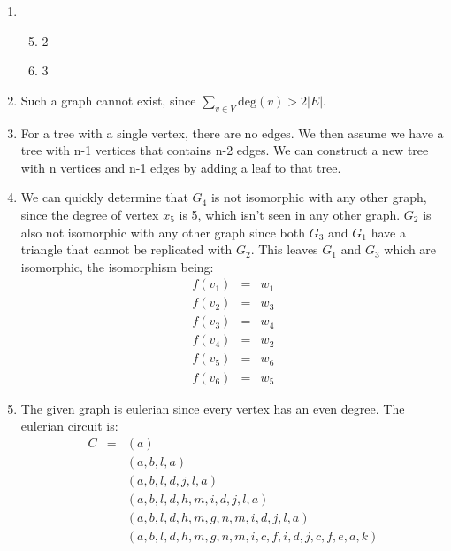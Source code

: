 \documentclass[12pt]{article}
\newcommand{\s}[1]{\setcounter{enumi}{#1}}
\begin{document}
\begin{enumerate}

  \item
    \begin{enumerate}
      \setcounter{enumii}{4}

       \item 2

       \item 3

    \end{enumerate}

  \s{2}

  \item Such a graph cannot exist, since $\sum_{v \in V} \mathrm{deg}(v) > 2 |E|$.

  \s{5}

  \item For a tree with a single vertex, there are no edges. We then assume we have a tree with n-1 vertices that contains n-2 edges. We can construct a new tree with n vertices and n-1 edges by adding a leaf to that tree.

  \item We can quickly determine that $G_4$ is not isomorphic with any other graph, since the degree of vertex $x_5$ is 5, which isn't seen in any other graph. $G_2$ is also not isomorphic with any other graph since both $G_3$ and $G_1$ have a triangle that cannot be replicated with $G_2$. This leaves $G_1$ and $G_3$ which are isomorphic, the isomorphism being:
    \begin{eqnarray*}
      f\left(v_1\right) &=& w_1 \\ 
      f\left(v_2\right) &=& w_3 \\
      f\left(v_3\right) &=& w_4 \\
      f\left(v_4\right) &=& w_2 \\
      f\left(v_5\right) &=& w_6 \\
      f\left(v_6\right) &=& w_5
    \end{eqnarray*}

  \s{8}

  \item The given graph is eulerian since every vertex has an even degree. The eulerian circuit is:
    \begin{eqnarray*}
      C &=& \left(a\right) \\
        & & \left(a, b, l, a\right) \\
        & & \left(a, b, l, d, j, l, a\right) \\
        & & \left(a, b, l, d, h, m, i, d, j, l, a\right) \\
        & & \left(a, b, l, d, h, m, g, n, m, i, d, j, l, a\right) \\
        & & \left(a, b, l, d, h, m, g, n, m, i, c, f, i, d, j, c, f, e, a, k\right)
    \end{eqnarray*}


\end{enumerate}
\end{document}
